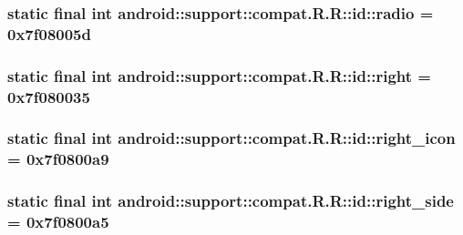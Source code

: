 \hypertarget{classandroid_1_1support_1_1compat_1_1_r_1_1id_1d5abedef78f9864dd222733d09912dd}{
\subsubsection[{radio}]{\setlength{\rightskip}{0pt plus 5cm}static final int android::support::compat.R.R::id::radio = 0x7f08005d}}
\label{classandroid_1_1support_1_1compat_1_1_r_1_1id_1d5abedef78f9864dd222733d09912dd}


\hypertarget{classandroid_1_1support_1_1compat_1_1_r_1_1id_712675d64449a7ab311d934cdb5e63c3}{
\subsubsection[{right}]{\setlength{\rightskip}{0pt plus 5cm}static final int android::support::compat.R.R::id::right = 0x7f080035}}
\label{classandroid_1_1support_1_1compat_1_1_r_1_1id_712675d64449a7ab311d934cdb5e63c3}


\hypertarget{classandroid_1_1support_1_1compat_1_1_r_1_1id_6de31a4ae2f33e235a2f3abce509089b}{
\subsubsection[{right\_\-icon}]{\setlength{\rightskip}{0pt plus 5cm}static final int android::support::compat.R.R::id::right\_\-icon = 0x7f0800a9}}
\label{classandroid_1_1support_1_1compat_1_1_r_1_1id_6de31a4ae2f33e235a2f3abce509089b}


\hypertarget{classandroid_1_1support_1_1compat_1_1_r_1_1id_d7f3b4f39e393cf1aacab5fb3daba492}{
\subsubsection[{right\_\-side}]{\setlength{\rightskip}{0pt plus 5cm}static final int android::support::compat.R.R::id::right\_\-side = 0x7f0800a5}}
\label{classandroid_1_1support_1_1compat_1_1_r_1_1id_d7f3b4f39e393cf1aacab5fb3daba492}


